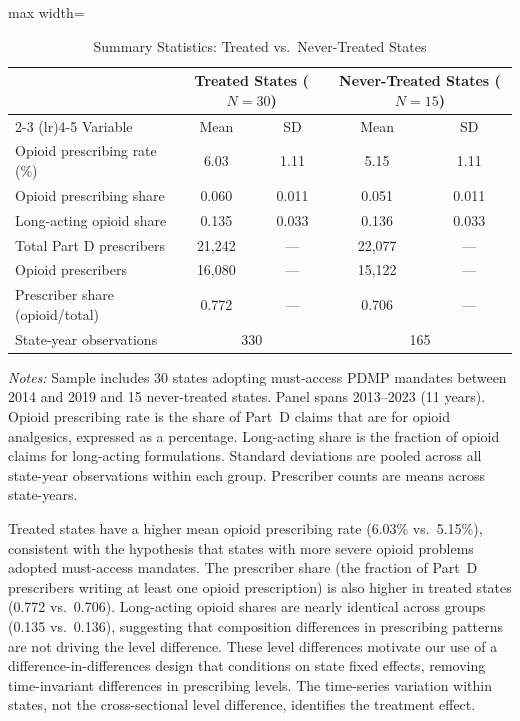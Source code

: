 \documentclass[12pt]{article}
\begin{document}
\begin{table}[htbp]
\centering
\caption{Summary Statistics: Treated vs.\ Never-Treated States}
\label{tab:summary}
\begin{adjustbox}{max width=\textwidth}
\begin{threeparttable}
\begin{tabular}{lcccc}
\toprule
& \multicolumn{2}{c}{Treated States ($N = 30$)} & \multicolumn{2}{c}{Never-Treated States ($N = 15$)} \\
\cmidrule(lr){2-3} \cmidrule(lr){4-5}
Variable & Mean & SD & Mean & SD \\
\midrule
Opioid prescribing rate (\%) & 6.03 & 1.11 & 5.15 & 1.11 \\
Opioid prescribing share & 0.060 & 0.011 & 0.051 & 0.011 \\
Long-acting opioid share & 0.135 & 0.033 & 0.136 & 0.033 \\
Total Part D prescribers & 21,242 & --- & 22,077 & --- \\
Opioid prescribers & 16,080 & --- & 15,122 & --- \\
Prescriber share (opioid/total) & 0.772 & --- & 0.706 & --- \\
\midrule
State-year observations & \multicolumn{2}{c}{330} & \multicolumn{2}{c}{165} \\
\bottomrule
\end{tabular}
\begin{tablenotes}
\footnotesize
\item \textit{Notes:} Sample includes 30 states adopting must-access PDMP mandates between 2014 and 2019 and 15 never-treated states. Panel spans 2013--2023 (11 years). Opioid prescribing rate is the share of Part~D claims that are for opioid analgesics, expressed as a percentage. Long-acting share is the fraction of opioid claims for long-acting formulations. Standard deviations are pooled across all state-year observations within each group. Prescriber counts are means across state-years.
\end{tablenotes}
\end{threeparttable}
\end{adjustbox}
\end{table}

Treated states have a higher mean opioid prescribing rate (6.03\% vs.\ 5.15\%), consistent with the hypothesis that states with more severe opioid problems adopted must-access mandates. The prescriber share (the fraction of Part~D prescribers writing at least one opioid prescription) is also higher in treated states (0.772 vs.\ 0.706). Long-acting opioid shares are nearly identical across groups (0.135 vs.\ 0.136), suggesting that composition differences in prescribing patterns are not driving the level difference. These level differences motivate our use of a difference-in-differences design that conditions on state fixed effects, removing time-invariant differences in prescribing levels. The time-series variation within states, not the cross-sectional level difference, identifies the treatment effect.
\end{document}

